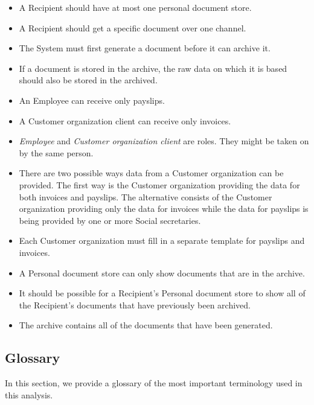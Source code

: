 \documentclass[a4paper,10pt]{article}
\begin{document}
\begin{itemize}
    \item A Recipient should have at most one personal document store.
    \item A Recipient should get a specific document over one channel.
    \item The System must first generate a document before it can archive it.
    \item If a document is stored in the archive, the raw data on which it is based should also be stored in the archived. 
    \item An Employee can receive only payslips.
    \item A Customer organization client can receive only invoices.
    \item \emph{Employee} and \emph{Customer organization client} are roles. They might be taken on by the same person.
    \item There are two possible ways data from a Customer organization can be provided. The first way is the Customer organization providing the data for both invoices and payslips. The alternative consists of the Customer organization providing only the data for invoices while the data for payslips is being provided by one or more Social secretaries.
    \item Each Customer organization must fill in a separate template for payslips and invoices.
    \item A Personal document store can only show documents that are in the archive.
    \item It should be possible for a Recipient's Personal document store to show all of the Recipient's documents that have previously been archived.
    \item The archive contains all of the documents that have been generated.
\end{itemize}

\subsection{Glossary}
In this section, we provide a glossary of the most important terminology used
in this analysis.
\end{document}

